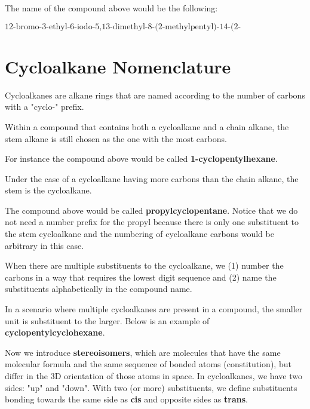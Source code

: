 \documentclass[10pt]{article}
\begin{document}
  The name of the compound above would be the following:

  \[
      \text{12-bromo-3-ethyl-6-iodo-5,13-dimethyl-8-(2-methylpentyl)-14-(2-methylpropyl)octadecane}
  \]

\section{Cycloalkane Nomenclature}

  Cycloalkanes are alkane rings that are named according to the number of carbons with a "cyclo-" prefix.


  Within a compound that contains both a cycloalkane and a chain alkane, the stem alkane is still chosen as the one with the most carbons. 


  For instance the compound above would be called \textbf{1-cyclopentylhexane}.

  Under the case of a cycloalkane having more carbons than the chain alkane, the stem is the cycloalkane.


  The compound above would be called \textbf{propylcyclopentane}. Notice that we do not need a number prefix for the propyl because there is only one substituent to the stem cycloalkane and the numbering of cycloalkane carbons would be arbitrary in this case.

  When there are multiple substituents to the cycloalkane, we (1) number the carbons in a way that requires the lowest digit sequence and (2) name the substituents alphabetically in the compound name.
  

  In a scenario where multiple cycloalkanes are present in a compound, the smaller unit is substituent to the larger. Below is an example of \textbf{cyclopentylcyclohexane}.


  Now we introduce \textbf{stereoisomers}, which are molecules that have the same molecular formula and the same sequence of bonded atoms (constitution), but differ in the 3D orientation of those atoms in space. In cycloalkanes, we have two sides: "up" and "down". With two (or more) substituents, we define substituents bonding towards the same side as \textbf{cis} and opposite sides as \textbf{trans}.
\end{document}
